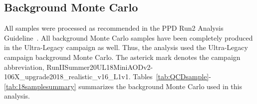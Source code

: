 


\subsection{Background Monte Carlo}
All samples were processed as recommended in the PPD Run2 Analysis Guideline~\cite{pdmv}.
All background Monte Carlo samples have been completely produced in the Ultra-Legacy campaign as well.
Thus, the analysis used the Ultra-Legacy campaign background Monte Carlo.
The asterick mark denotes the campaign abbreviation, RunIISummer20UL18MiniAODv2-106X\_upgrade2018\_realistic\_v16\_L1v1.
Tables~\ref{tab:QCDsample}-\ref{tab:18samplesummary} summarizes the background Monte Carlo used in this analysis.

